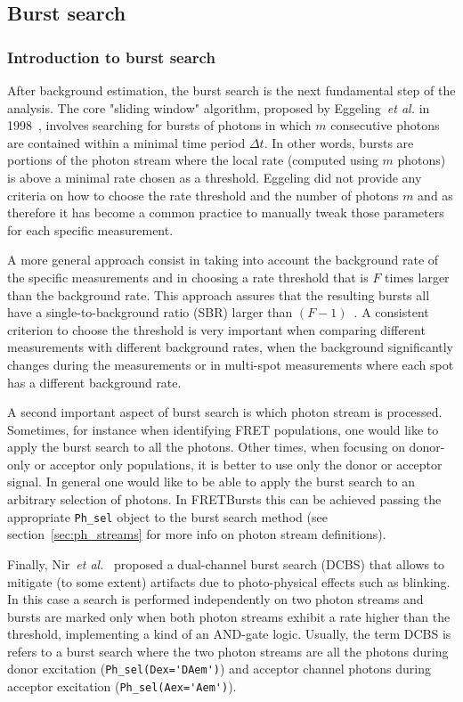\subsection{Burst search}
\label{sec:burstsearch}

\subsubsection{Introduction to burst search}
\label{sec:burstsearch_intro}

After background estimation, the burst search is the next fundamental step of
the analysis. The core "sliding window" algorithm, proposed by
Eggeling~\textit{et al.} in 1998~\cite{Eggeling_1998}, involves searching for
bursts of photons
in which $m$ consecutive photons are contained within a minimal time period
$\Delta t$. In other words, bursts are portions of the photon stream where the
local rate (computed using $m$ photons) is above a minimal rate chosen as a
threshold. Eggeling did not provide any criteria on how to choose the rate
threshold and the number of photons $m$ and as therefore it has become a common
practice to manually tweak those parameters for each specific measurement. 

A more general approach consist in taking into account the background rate of
the specific measurements and in choosing a rate threshold that is $F$ times
larger than the background rate. This approach assures that the resulting bursts
all have a single-to-background ratio (SBR) larger than
$(F-1)$~\cite{Michalet_2012}. A consistent criterion to choose the threshold is
very important when comparing different measurements with different background
rates, when the background significantly changes during the measurements or in
multi-spot measurements where each spot has a different background rate.

A second important aspect of burst search is which photon stream is processed.
Sometimes, for instance when identifying FRET populations, one would like to
apply the burst search to all the photons. Other times, when focusing on
donor-only or acceptor only populations, it is better to use only the donor or
acceptor signal. In general one would like to be able to apply the burst search
to an arbitrary selection of photons. In FRETBursts this can be achieved passing
the appropriate \verb|Ph_sel| object to the burst search method (see
section~\ref{sec:ph_streams} for more info on photon stream definitions).

Finally, Nir~\textit{et al.}~\cite{Nir_2006} proposed a dual-channel burst
search (DCBS) that allows to mitigate (to some extent) artifacts due to
photo-physical effects such as blinking. In this case a search is performed
independently on two photon streams and bursts are marked only when both photon
streams exhibit a rate higher than the threshold, 
implementing a kind of an AND-gate logic. 
Usually, the term DCBS is refers to a burst search where the two photon streams
are all the photons 
during donor excitation (\verb|Ph_sel(Dex='DAem')|) and acceptor channel photons
during acceptor 
excitation (\verb|Ph_sel(Aex='Aem')|).

